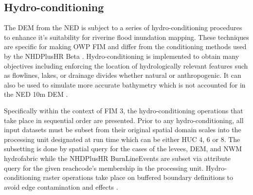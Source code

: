 \subsection{Hydro-conditioning}
%
The DEM from the NED is subject to a series of hydro-conditioning procedures to enhance it's suitability for riverine flood inundation mapping. 
These techniques are specific for making OWP FIM and differ from the conditioning methods used by the NHDPlusHR Beta \cite{moore2019user}.
Hydro-conditioning is implemented to obtain many objectives including enforcing the location of hydrologically relevant features such as flowlines, lakes, or drainage divides whether natural or anthropogenic. 
It can also be used to simulate more accurate bathymetry which is not accounted for in the NED 10m DEM \cite{gesch2002national}.

Specifically within the context of FIM 3, the hydro-conditioning operations that take place in sequential order are presented. 
Prior to any hydro-conditioning, all input datasets must be subset from their original spatial domain scales into the processing unit designated at run time which can be either HUC 4, 6 or 8. 
The subsetting is done by spatial query for the cases of the levees, DEM, and NWM hydrofabric while the NHDPlusHR BurnLineEvents are subset via attribute query for the given reachcode's membership in the processing unit.
Hydro-conditioning raster operations take place on buffered boundary definitions to avoid edge contamination and effects \cite{lindsay2013measuring}. 
%
